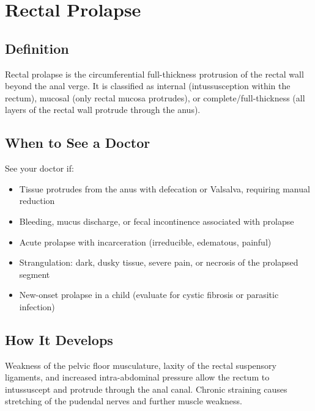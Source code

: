 \chapter{Rectal Prolapse}

\section*{Definition}
Rectal prolapse is the circumferential full-thickness protrusion of the rectal wall beyond the anal verge. It is classified as internal (intussusception within the rectum), mucosal (only rectal mucosa protrudes), or complete/full-thickness (all layers of the rectal wall protrude through the anus).

\section*{When to See a Doctor}
See your doctor if:
\begin{itemize}
  \item Tissue protrudes from the anus with defecation or Valsalva, requiring manual reduction
  \item Bleeding, mucus discharge, or fecal incontinence associated with prolapse
  \item Acute prolapse with incarceration (irreducible, edematous, painful)
  \item Strangulation: dark, dusky tissue, severe pain, or necrosis of the prolapsed segment
  \item New-onset prolapse in a child (evaluate for cystic fibrosis or parasitic infection)
\end{itemize}

\section*{How It Develops}
Weakness of the pelvic floor musculature, laxity of the rectal suspensory ligaments, and increased intra-abdominal pressure allow the rectum to intussuscept and protrude through the anal canal. Chronic straining causes stretching of the pudendal nerves and further muscle weakness.

